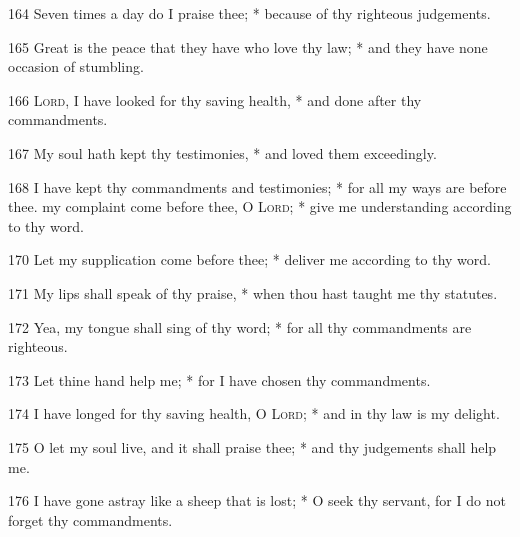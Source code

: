 164 Seven times a day do I praise thee; * because of thy righteous judgements.\par
165 Great is the peace that they have who love thy law; * and they have none occasion of stumbling.\par
166 {\textsc{Lord}}, I have looked for thy saving health, * and done after thy commandments.\par
167 My soul hath kept thy testimonies, * and loved them exceedingly.\par
168 I have kept thy commandments and testimonies; * for all my ways are before thee.
 my complaint come before thee, O {\textsc{Lord}}; * give me understanding according to thy word.\par
170 Let my supplication come before thee; * deliver me according to thy word.\par
171 My lips shall speak of thy praise, * when thou hast taught me thy statutes.\par
172 Yea, my tongue shall sing of thy word; * for all thy commandments are righteous.\par
173 Let thine hand help me; * for I have chosen thy commandments.\par
174 I have longed for thy saving health, O {\textsc{Lord}}; * and in thy law is my delight.\par
175 O let my soul live, and it shall praise thee; * and thy judgements shall help me.\par
176 I have gone astray like a sheep that is lost; * O seek thy servant, for I do not forget thy commandments.
